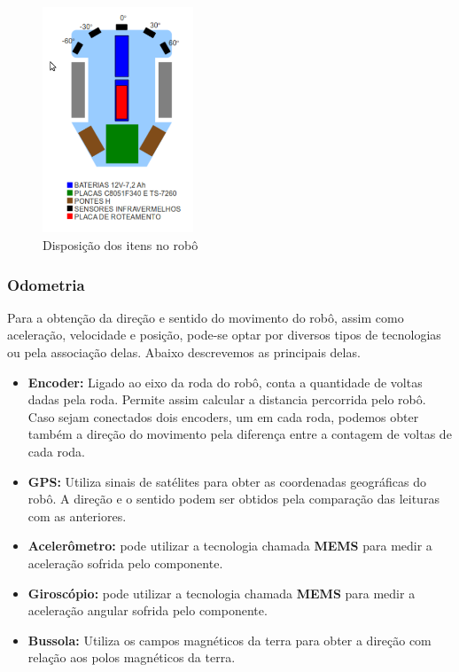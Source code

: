 \begin{figure}[H]
\centering
\includegraphics[width=0.4\textwidth]{./figuras/disposicao-robo.png}
\caption[Disposição dos itens no robô]{Disposição dos itens no robô}
\label{fig:disposicao_bellator_2012}
\end{figure}

\subsubsection{Odometria}

Para a obtenção da direção e sentido do movimento do robô, assim como aceleração, velocidade e posição, pode-se optar por diversos tipos de tecnologias ou pela associação delas. Abaixo descrevemos as principais delas.

\begin{itemize}
  \item \textbf{Encoder:} Ligado ao eixo da roda do robô, conta a quantidade de voltas dadas pela roda. Permite assim calcular a distancia percorrida pelo robô. Caso sejam conectados dois encoders, um em cada roda, podemos obter também a direção do movimento pela diferença entre a contagem de voltas de cada roda.
  \item \textbf{GPS:} Utiliza sinais de satélites para obter as coordenadas geográficas do robô. A direção e o sentido podem ser obtidos pela comparação das leituras com as anteriores.
  \item 	\textbf{Acelerômetro:} pode utilizar a tecnologia chamada \textbf{MEMS} para medir a aceleração sofrida pelo componente.
  \item 	\textbf{Giroscópio:} pode utilizar a tecnologia chamada \textbf{MEMS} para medir a aceleração angular sofrida pelo componente.
  \item 	\textbf{Bussola:} Utiliza os campos magnéticos da terra para obter a direção com relação aos polos magnéticos da terra.
\end{itemize}

